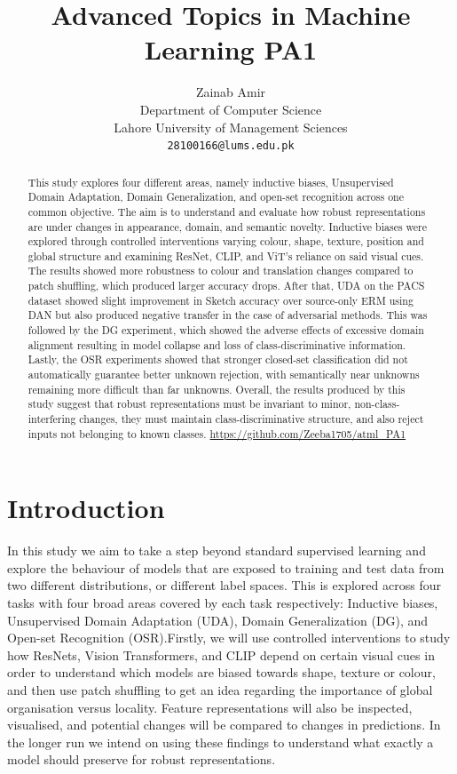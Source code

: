 \documentclass{article}
\title{Advanced Topics in Machine Learning PA1}
\author{%
  Zainab Amir \\
  Department of Computer Science\\
  Lahore University of Management Sciences\\
  \texttt{28100166@lums.edu.pk} \\
}
\begin{document}
\maketitle


\begin{abstract}
This study explores four different areas, namely inductive biases, Unsupervised Domain Adaptation, Domain Generalization, and open-set recognition across one common objective. The aim is to understand and evaluate how robust representations are under changes in appearance, domain, and semantic novelty. Inductive biases were explored through controlled interventions varying colour, shape, texture, position and global structure and examining ResNet, CLIP, and ViT's reliance on said visual cues. The results showed more robustness to colour and translation changes compared to patch shuffling, which produced larger accuracy drops. After that, UDA on the PACS dataset showed slight improvement in Sketch accuracy over source-only ERM using DAN but also produced negative transfer in the case of adversarial methods. This was followed by the DG experiment, which showed the adverse effects of excessive domain alignment resulting in model collapse and loss of class-discriminative information. Lastly, the OSR experiments showed that stronger closed-set classification did not automatically guarantee better unknown rejection, with semantically near unknowns remaining more difficult than far unknowns. Overall, the results produced by this study suggest that robust representations must be invariant to minor, non-class-interfering changes, they must maintain class-discriminative structure, and also reject inputs not belonging to known classes. \url{https://github.com/Zeeba1705/atml_PA1}

\end{abstract}




\section{Introduction}
\label{sec:introduction}
In this study we aim to take a step beyond standard supervised learning and explore the behaviour of models that are exposed to training and test data from two different distributions, or different label spaces. This is explored across four tasks with four broad areas covered by each task respectively:  Inductive biases, Unsupervised Domain Adaptation (UDA), Domain Generalization (DG), and Open-set Recognition (OSR).Firstly, we will use controlled interventions to study how ResNets, Vision Transformers, and CLIP depend on certain visual cues in order to understand which models are biased towards shape, texture or colour, and then use patch shuffling to get an idea regarding the importance of global organisation versus locality. Feature representations will also be inspected, visualised, and potential changes will be compared to changes in predictions. In the longer run we intend on using these findings to understand what exactly a model should preserve for robust representations. 
\end{document}
